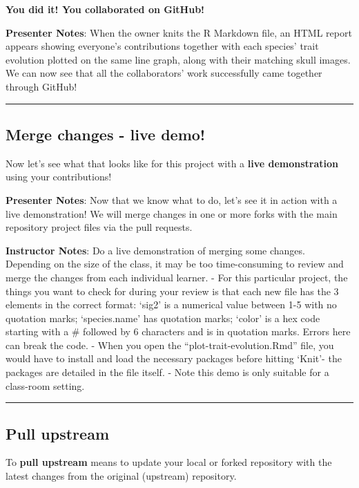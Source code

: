 \documentclass[
  letterpaper,
  DIV=11,
  numbers=noendperiod]{scrartcl}
\begin{document}
\textbf{You did it! You collaborated on GitHub!}

\textbf{Presenter Notes}: When the owner knits the R Markdown file, an
HTML report appears showing everyone's contributions together with each
species' trait evolution plotted on the same line graph, along with
their matching skull images. We can now see that all the collaborators'
work successfully came together through GitHub!

\begin{center}\rule{0.5\linewidth}{0.5pt}\end{center}

\subsection{Merge changes - live demo!}\label{merge-changes---live-demo}

Now let's see what that looks like for this project with a \textbf{live
demonstration} using your contributions!

\textbf{Presenter Notes}: Now that we know what to do, let's see it in
action with a live demonstration! We will merge changes in one or more
forks with the main repository project files via the pull requests.

\textbf{Instructor Notes}: Do a live demonstration of merging some
changes. Depending on the size of the class, it may be too
time-consuming to review and merge the changes from each individual
learner. - For this particular project, the things you want to check for
during your review is that each new file has the 3 elements in the
correct format: `sig2' is a numerical value between 1-5 with no
quotation marks; `species.name' has quotation marks; `color' is a hex
code starting with a \# followed by 6 characters and is in quotation
marks. Errors here can break the code. - When you open the
``plot-trait-evolution.Rmd'' file, you would have to install and load
the necessary packages before hitting `Knit'- the packages are detailed
in the file itself. - Note this demo is only suitable for a class-room
setting.

\begin{center}\rule{0.5\linewidth}{0.5pt}\end{center}

\subsection{Pull upstream}\label{pull-upstream}

To \textbf{pull upstream} means to update your local or forked
repository with the latest changes from the original (upstream)
repository.
\end{document}
